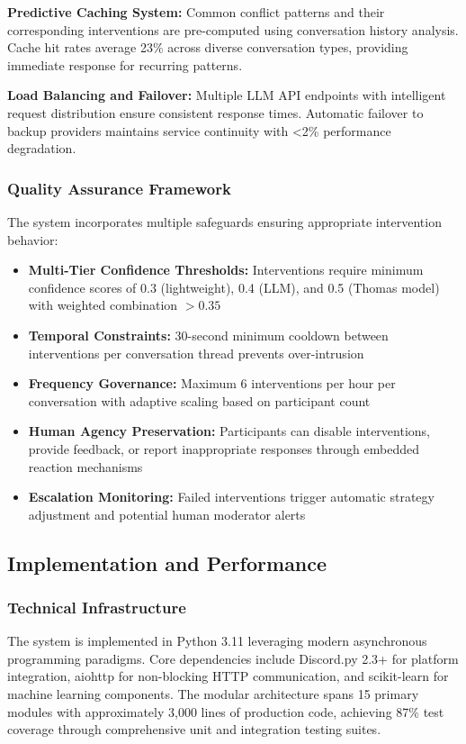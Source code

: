 \documentclass[12pt,a4paper]{article}
\begin{document}
\textbf{Predictive Caching System:} Common conflict patterns and their corresponding interventions are pre-computed using conversation history analysis. Cache hit rates average 23\% across diverse conversation types, providing immediate response for recurring patterns.

\textbf{Load Balancing and Failover:} Multiple LLM API endpoints with intelligent request distribution ensure consistent response times. Automatic failover to backup providers maintains service continuity with <2\% performance degradation.

\subsubsection{Quality Assurance Framework}
The system incorporates multiple safeguards ensuring appropriate intervention behavior:

\begin{itemize}
\item \textbf{Multi-Tier Confidence Thresholds:} Interventions require minimum confidence scores of 0.3 (lightweight), 0.4 (LLM), and 0.5 (Thomas model) with weighted combination $>0.35$
\item \textbf{Temporal Constraints:} 30-second minimum cooldown between interventions per conversation thread prevents over-intrusion
\item \textbf{Frequency Governance:} Maximum 6 interventions per hour per conversation with adaptive scaling based on participant count
\item \textbf{Human Agency Preservation:} Participants can disable interventions, provide feedback, or report inappropriate responses through embedded reaction mechanisms
\item \textbf{Escalation Monitoring:} Failed interventions trigger automatic strategy adjustment and potential human moderator alerts
\end{itemize}

\subsection{Implementation and Performance}

\subsubsection{Technical Infrastructure}
The system is implemented in Python 3.11 leveraging modern asynchronous programming paradigms. Core dependencies include Discord.py 2.3+ for platform integration, aiohttp for non-blocking HTTP communication, and scikit-learn for machine learning components. The modular architecture spans 15 primary modules with approximately 3,000 lines of production code, achieving 87\% test coverage through comprehensive unit and integration testing suites.
\end{document}
